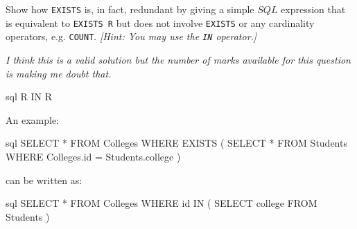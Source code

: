 \documentclass{supervision}
\begin{document}
\begin{questions}
\begin{parts}
          Show how \lstinline|EXISTS| is, in fact, redundant by giving a simple
          ${SQL}$ expression that is equivalent to \lstinline|EXISTS R| but
          does not involve \lstinline|EXISTS| or any cardinality operators,
          e.g. \lstinline|COUNT|. \emph{[Hint: You may use the \lstinline|IN|
          operator.]}
          \begin{solution}
            \emph{I think this is a valid solution but the number of marks
            available for this question is making me doubt that.}
            \begin{code}{sql}
              R IN R
            \end{code}

            An example:
            \begin{code}{sql}
              SELECT *
              FROM Colleges
              WHERE EXISTS (
                  SELECT *
                  FROM Students
                  WHERE Colleges.id = Students.college
              )
            \end{code}
            can be written as:
            \begin{code}{sql}
              SELECT *
              FROM Colleges
              WHERE id IN (
                  SELECT college
                  FROM Students
              )
            \end{code}
          \end{solution}
      \end{parts}


  \end{questions}
\end{document}

